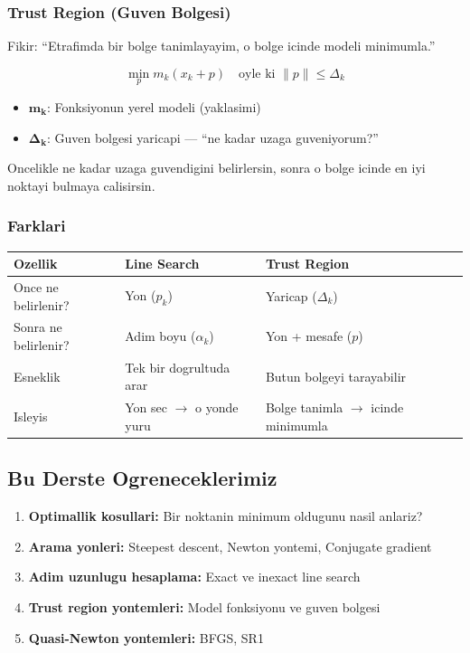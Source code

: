 \documentclass[12pt,a4paper]{article}
\theoremstyle{definition}
\theoremstyle{remark}
\begin{document}
\subsubsection{Trust Region (Guven Bolgesi)}

Fikir: ``Etrafimda bir bolge tanimlayayim, o bolge icinde modeli minimumla.''

\[
\min_p m_k(x_k + p) \quad \text{oyle ki } \|p\| \leq \Delta_k
\]

\begin{itemize}[leftmargin=*, itemsep=0.2em]
\item $\mathbf{m_k}$: Fonksiyonun yerel modeli (yaklasimi)
\item $\boldsymbol{\Delta_k}$: Guven bolgesi yaricapi --- ``ne kadar uzaga guveniyorum?''
\end{itemize}

Oncelikle ne kadar uzaga guvendigini belirlersin, sonra o bolge icinde en iyi noktayi bulmaya calisirsin.

\subsubsection{Farklari}

\begin{center}
\begin{tabular}{@{}llll@{}}
\toprule
\textbf{Ozellik} & \textbf{Line Search} & \textbf{Trust Region} \\
\midrule
Once ne belirlenir? & Yon ($p_k$) & Yaricap ($\Delta_k$) \\
Sonra ne belirlenir? & Adim boyu ($\alpha_k$) & Yon + mesafe ($p$) \\
Esneklik & Tek bir dogrultuda arar & Butun bolgeyi tarayabilir \\
Isleyis & Yon sec $\rightarrow$ o yonde yuru & Bolge tanimla $\rightarrow$ icinde minimumla \\
\bottomrule
\end{tabular}
\end{center}

\subsection{Bu Derste Ogreneceklerimiz}

\begin{enumerate}[leftmargin=*, itemsep=0.3em]
\item \textbf{Optimallik kosullari:} Bir noktanin minimum oldugunu nasil anlariz?
\item \textbf{Arama yonleri:} Steepest descent, Newton yontemi, Conjugate gradient
\item \textbf{Adim uzunlugu hesaplama:} Exact ve inexact line search
\item \textbf{Trust region yontemleri:} Model fonksiyonu ve guven bolgesi
\item \textbf{Quasi-Newton yontemleri:} BFGS, SR1
\end{enumerate}
\end{document}
